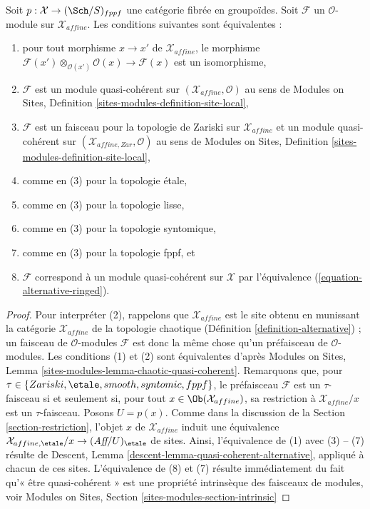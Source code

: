 \begin{lemma}
\label{lemma-quasi-coherent-alternative}
Soit $p : \mathcal{X} \to (\Sch/S)_{fppf}$ une catégorie fibrée en groupoïdes.
Soit $\mathcal{F}$ un $\mathcal{O}$-module sur $\mathcal{X}_{affine}$.
Les conditions suivantes sont équivalentes :
\begin{enumerate}
\item pour tout morphisme $x \to x'$ de $\mathcal{X}_{affine}$, le morphisme
$\mathcal{F}(x') \otimes_{\mathcal{O}(x')} \mathcal{O}(x) \to \mathcal{F}(x)$
est un isomorphisme,
\item $\mathcal{F}$ est un module quasi-cohérent sur
$(\mathcal{X}_{affine}, \mathcal{O})$ au sens de
Modules on Sites, Definition \ref{sites-modules-definition-site-local},
\item $\mathcal{F}$ est un faisceau pour la topologie de Zariski sur
$\mathcal{X}_{affine}$ et un module quasi-cohérent sur
$(\mathcal{X}_{affine, Zar}, \mathcal{O})$ au sens de
Modules on Sites, Definition \ref{sites-modules-definition-site-local},
\item comme en (3) pour la topologie étale,
\item comme en (3) pour la topologie lisse,
\item comme en (3) pour la topologie syntomique,
\item comme en (3) pour la topologie fppf, et
\item $\mathcal{F}$ correspond à un module quasi-cohérent
sur $\mathcal{X}$ par l'équivalence (\ref{equation-alternative-ringed}).
\end{enumerate}
\end{lemma}

\begin{proof}
Pour interpréter (2), rappelons que $\mathcal{X}_{affine}$ est le site
obtenu en munissant la catégorie $\mathcal{X}_{affine}$ de la topologie
chaotique (Définition \ref{definition-alternative}) ; un faisceau
de $\mathcal{O}$-modules $\mathcal{F}$ est donc la même chose qu'un
préfaisceau de $\mathcal{O}$-modules. Les conditions (1) et (2)
sont équivalentes d'après Modules on Sites, Lemma
\ref{sites-modules-lemma-chaotic-quasi-coherent}.
Remarquons que, pour $\tau \in \{Zariski, \etale, smooth, syntomic, fppf\}$,
le préfaisceau $\mathcal{F}$ est un $\tau$-faisceau si et seulement si,
pour tout $x \in \Ob(\mathcal{X}_{affine})$, sa restriction
à $\mathcal{X}_{affine}/x$ est un $\tau$-faisceau. Posons $U = p(x)$.
Comme dans la discussion de la Section \ref{section-restriction},
l'objet $x$ de $\mathcal{X}_{affine}$ induit une équivalence
$\mathcal{X}_{affine, \etale}/x \to (\textit{Aff}/U)_\etale$ de sites.
Ainsi, l'équivalence de (1) avec (3) -- (7)
résulte de Descent, Lemma \ref{descent-lemma-quasi-coherent-alternative},
appliqué à chacun de ces sites. L'équivalence de (8) et (7)
résulte immédiatement du fait qu'« être quasi-cohérent » est une
propriété intrinsèque des faisceaux de modules, voir
Modules on Sites, Section \ref{sites-modules-section-intrinsic}
\end{proof}

